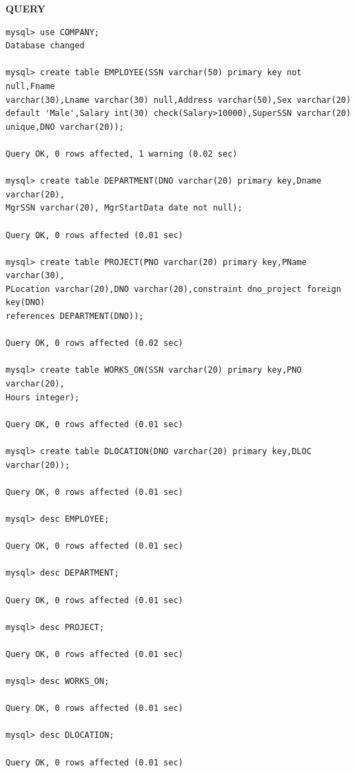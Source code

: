 \documentclass[a4paper,12pt]{report}
\begin{document}
	\begin{flushleft}
		\textbf{QUERY }
	\end{flushleft}
\begin{verbatim}
mysql> use COMPANY;
Database changed

mysql> create table EMPLOYEE(SSN varchar(50) primary key not null,Fname 
varchar(30),Lname varchar(30) null,Address varchar(50),Sex varchar(20)
default 'Male',Salary int(30) check(Salary>10000),SuperSSN varchar(20)
unique,DNO varchar(20));

Query OK, 0 rows affected, 1 warning (0.02 sec)

mysql> create table DEPARTMENT(DNO varchar(20) primary key,Dname varchar(20),
MgrSSN varchar(20), MgrStartData date not null);

Query OK, 0 rows affected (0.01 sec)

mysql> create table PROJECT(PNO varchar(20) primary key,PName varchar(30),
PLocation varchar(20),DNO varchar(20),constraint dno_project foreign key(DNO) 
references DEPARTMENT(DNO));

Query OK, 0 rows affected (0.02 sec)

mysql> create table WORKS_ON(SSN varchar(20) primary key,PNO varchar(20),
Hours integer);

Query OK, 0 rows affected (0.01 sec)

mysql> create table DLOCATION(DNO varchar(20) primary key,DLOC varchar(20));

Query OK, 0 rows affected (0.01 sec)

mysql> desc EMPLOYEE;

Query OK, 0 rows affected (0.01 sec)

mysql> desc DEPARTMENT;

Query OK, 0 rows affected (0.01 sec)

mysql> desc PROJECT;

Query OK, 0 rows affected (0.01 sec)

mysql> desc WORKS_ON;

Query OK, 0 rows affected (0.01 sec)

mysql> desc DLOCATION;

Query OK, 0 rows affected (0.01 sec)

\end{verbatim}
\end{document}
